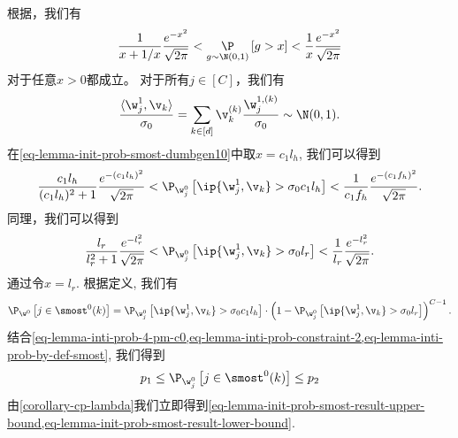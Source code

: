 \begin{myproof}
根据\cite{Dumbgen10}，我们有 
\begin{equation}\label{eq-lemma-init-prob-smost-dumbgen10}
    \frac{1}{x + 1/x} \frac{ e^{-x^2} }{\sqrt{2\pi}}
     < \mathop{\P}_{g \sim \N(0,1)} \left[ g > x \right]
     < \frac{1}{x} \frac{ e^{-x^2} }{\sqrt{2\pi}}
\end{equation}
对于任意$x > 0$都成立。 
对于所有$ j \in [C]$，我们有
\begin{equation}\label{eq-lemma-inti-prob-constraint-1}
    \frac{\langle{\w_j^1, \v_k \rangle}}{\sigma_0} = \sum_{k \in [d]} \v_k^{(k)} \frac{\w_j^{1,(k)}}{\sigma_0}  \sim \N(0,1).
\end{equation}
在\cref{eq-lemma-init-prob-smost-dumbgen10}中取$x = c_1 l_h $, 我们可以得到
\begin{equation}\label{eq-lemma-inti-prob-4-pm-c0}
\frac{c_1 l_h}{(c_1 l_h)^2 + 1} \frac{ e^{-(c_1 l_h)^2} }{\sqrt{2\pi}}
 < {\P}_{\w_j^{0}} \left[ \ip{\w_j^1, \v_k} > \sigma_0 c_1 l_h \right]
 < \frac{1}{c_1f_h} \frac{ e^{-(c_1f_h)^2} }{\sqrt{2\pi}}.
\end{equation}
同理，我们可以得到
\begin{equation}\label{eq-lemma-inti-prob-constraint-2}
\frac{l_r}{l_r^2 + 1} \frac{ e^{-l_r^2} }{\sqrt{2\pi}}
 < {\P}_{\w_j^{0}} \left[ \ip{\w_j^1, \v_k} > \sigma_0 l_r \right]
 < \frac{1}{l_r} \frac{ e^{-l_r^2} }{\sqrt{2\pi}}.
\end{equation}
通过令$x = l_r$.
根据定义, 我们有
\begin{equation}\label{eq-lemma-inti-prob-by-def-smost}
    {\P}_{\w^{0}} \left[ j \in  \smost^0(k) \right] = 
    {\P}_{\w_j^{0}} \left[ \ip{\w_j^1, \v_k} > \sigma_0 c_1 l_h \right] \cdot 
    \left( 1 -  {\P}_{\w_j^{0}} \left[ \ip{\w_j^1, \v_k} > \sigma_0 l_r \right] \right)^{C-1}.
\end{equation}
结合\cref{eq-lemma-inti-prob-4-pm-c0,eq-lemma-inti-prob-constraint-2,eq-lemma-inti-prob-by-def-smost}, 我们得到
\begin{equation}
    p_1 \leq {\P}_{\w_j^{0}} \left[ j \in  \smost^0(k) \right] \leq p_2
\end{equation}
由\cref{corollary-cp-lambda}我们立即得到\cref{eq-lemma-init-prob-smost-result-upper-bound,eq-lemma-init-prob-smost-result-lower-bound}.
\end{myproof}


